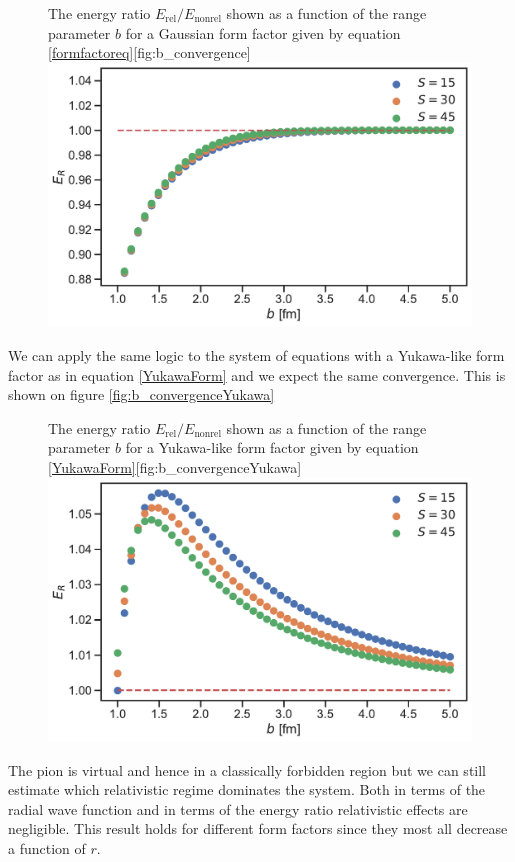 \begin{figure}[H]
	\begin{sidecaption}{The energy ratio $E_\text{rel}/E_\text{nonrel}$ shown as a function of the range parameter $b$ for a Gaussian form factor given by equation \eqref{formfactoreq}}[fig:b_convergence]
		\includegraphics[width=\linewidth]{Figures/bconvergence.pdf}
	\end{sidecaption}
\end{figure}
We can apply the same logic to the system of equations with a Yukawa-like form factor as in equation \eqref{YukawaForm} and we expect the same convergence. This is shown on figure \ref{fig:b_convergenceYukawa}
\begin{figure}[H]
	\begin{sidecaption}{The energy ratio $E_\text{rel}/E_\text{nonrel}$ shown as a function of the range parameter $b$ for a Yukawa-like form factor given by equation \eqref{YukawaForm}}[fig:b_convergenceYukawa]
		\includegraphics[width=\linewidth]{Figures/bconvergenceYukawa.pdf}
	\end{sidecaption}
\end{figure}
The pion is virtual and hence in a classically forbidden region but we can still estimate which relativistic regime dominates the system. Both in terms of the radial wave function and in terms of the energy ratio relativistic effects are negligible. This result holds for different form factors since they most all decrease a function of $r$. 

